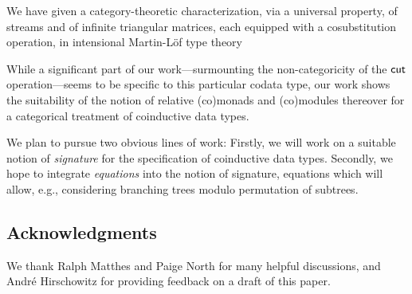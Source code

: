 \documentclass{amsart}
\begin{document}
We have given a category-theoretic characterization, via a universal property, of streams and of infinite triangular matrices,
each equipped with a cosubstitution operation,
in intensional Martin-L\"of type theory


While a significant part of our work---surmounting the non-categoricity of the $\mathsf{cut}$ operation---seems to be specific to this particular codata type,
our work shows the suitability of the notion of relative (co)monads and (co)modules thereover for 
a categorical treatment of coinductive data types.


We plan to pursue two obvious lines of work:
Firstly, we will work on a suitable notion of \emph{signature} for the specification of coinductive data types.
Secondly, we hope to integrate \emph{equations} into the notion of signature, equations which 
will allow, e.g., considering branching trees modulo permutation of subtrees.
 

\subsection*{Acknowledgments}
 We thank Ralph Matthes and Paige North for many helpful discussions, and Andr\'e Hirschowitz for providing feedback on
 a draft of this paper.

\printbibliography





% 
\end{document}
